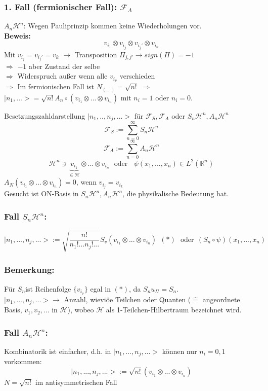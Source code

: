 \documentclass[twoside,a4paper]{scrartcl}
\newcommand{\R}{\mathbb{R}}
\renewcommand{\1}{\mathds{1}}
\newcommand{\Ra}{\Rightarrow}
\newcommand{\ra}{\rightarrow}
\renewcommand{\H}{\mathcal{H}}
\newcommand{\F}{\mathcal{F}}
\renewcommand{\R}{\mathbb{R}}
\begin{document}
\subsubsection*{1. Fall (fermionischer Fall): $\F_A$}
$A_n \H^n$: Wegen Pauliprinzip kommen keine Wiederholungen vor.\\
\textbf{Beweis:}\\
$$v_{i_1}\otimes v_{i_j}\otimes v_{i_j'}\otimes v_{i_n}$$
Mit $v_{i_j}=v_{i_j'}=v_k$ $\ra$ Transposition $\Pi_{j,j'} \ra sign(\Pi)=-1$\\
$\Ra$ $-1$ aber Zustand der selbe\\
$\Ra$ Widerspruch außer wenn alle $v_{i_\nu}$ verschieden\\
$\Ra$ Im fermionischen Fall ist $N_{(...)}=\sqrt{n!}$ $\Ra$ $|n_1,...>=\sqrt{n!}A_n \circ ({v_{i_1}\otimes ... \otimes v_{i_n}})$ mit $n_i=1$ oder $n_i=0$.


Besetzungszahldarstellung $|n_1,..,n_j,...>$ für $\F_S,\F_A$ oder $S_n\H^n, A_n \H^n$\\
$$\F_S:=\sum_{n=0}^\infty S_n \H^n$$
$$\F_A:=\sum_{n=0}^\infty A_n \H^n$$
$$\H^n \ni \underbrace{v_{i_1}}_{\in \H}\otimes ... \otimes v_{i_n} \ \ \ \mathrm{oder}\ \ \ \ \psi(x_1,...,x_n)\in L^2(\R^n)$$
$A_N(v_{i_1}\otimes ... \otimes v_{i_n})=0$, wenn $v_{i_j}=v_{i_k}$\\

Gesucht ist ON-Basis in $S_n\H^n,A_n\H^n$, die physikalische Bedeutung hat.
\subsubsection*{Fall $S_n\H^n$:}
$$|n_1,...,n_j,...>:=\sqrt{\frac{n!}{n_1!...n_j!...}}S_v(v_{i_1}\otimes ... \otimes v_{i_n})  \  \ (*) \ \ \ \mathrm{oder} \ \ (S_n \circ \psi)(x_1,...,x_n)$$
\subsubsection*{Bemerkung:}
Für $S_n$ist Reihenfolge $\{v_{i_\nu}\}$ egal in $(*)$, da $S_n u_\Pi=S_n$.\\
$|n_1,...,n_j,...> \ra$ Anzahl, wieviöe Teilchen oder Quanten ($\mathrel{\widehat{=}}$ angeordnete Basis, $v_1,v_2,...$ in $\H$), wobeo $\H$ als 1-Teilchen-Hilbertraum bezeichnet wird.
\subsubsection*{Fall $A_n\H^n$:}
Kombinatorik ist einfacher, d.h. in  $|n_1,...,n_j,...>$ können nur $n_i=0,1$ vorkommen:
$$|n_1,...,n_j,...>:=\sqrt{n!}(v_{i_1}\otimes ... \otimes v_{i_n})$$
$N=\sqrt{n!}$ im antisymmetrischen Fall
\end{document}
